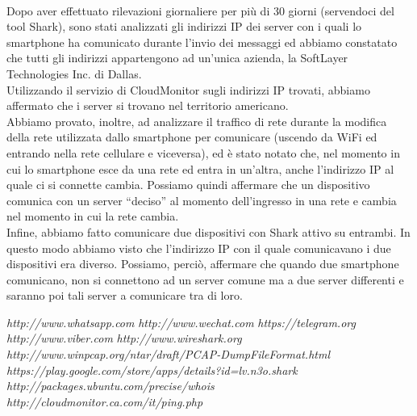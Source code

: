 \documentclass[a4paper,11pt]{book}
\begin{document}
~

Dopo aver effettuato rilevazioni giornaliere per pi\`u di 30 giorni (servendoci del tool Shark), sono stati analizzati gli indirizzi IP dei server con i quali lo smartphone ha comunicato durante l'invio dei messaggi ed abbiamo constatato che tutti gli indirizzi appartengono ad un'unica azienda, la SoftLayer Technologies Inc. di Dallas.\\
Utilizzando il servizio di CloudMonitor sugli indirizzi IP trovati, abbiamo affermato che i server si trovano nel territorio americano.\\
Abbiamo provato, inoltre, ad analizzare il traffico di rete durante la modifica della rete utilizzata dallo smartphone per comunicare (uscendo da WiFi ed entrando nella rete cellulare e viceversa), ed \`e stato notato che, nel momento in cui lo smartphone esce da una rete ed entra in un'altra, anche l'indirizzo IP al quale ci si connette cambia. Possiamo quindi affermare che un dispositivo comunica con un server ``deciso'' al momento dell'ingresso in una rete e cambia nel momento in cui la rete cambia.\\
Infine, abbiamo fatto comunicare due dispositivi con Shark attivo su entrambi. In questo modo abbiamo visto che l'indirizzo IP con il quale comunicavano i due dispositivi era diverso. Possiamo, perci\`o, affermare che quando due smartphone comunicano, non si connettono ad un server comune ma a due server differenti e saranno poi tali server a comunicare tra di loro. 

\begin{thebibliography}{}
 \emph{http://www.whatsapp.com}
 \emph{http://www.wechat.com}
 \emph{https://telegram.org}
 \emph{http://www.viber.com}
 \emph{http://www.wireshark.org}
 \emph{http://www.winpcap.org/ntar/draft/PCAP-DumpFileFormat.html}
 \emph{https://play.google.com/store/apps/details?id=lv.n3o.shark}
 \emph{http://packages.ubuntu.com/precise/whois}
 \emph{http://cloudmonitor.ca.com/it/ping.php}
\end{thebibliography}
\end{document}
